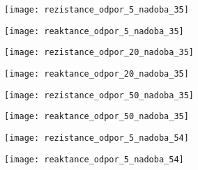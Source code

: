 \begin{figure}
\centering
\begin{minipage}{.5\textwidth}
  \centering
  \texttt{[image: rezistance\_odpor\_5\_nadoba\_35]}
\captionsetup{justification=centering}
\end{minipage}%
\begin{minipage}{.5\textwidth}
  \centering
  \texttt{[image: reaktance\_odpor\_5\_nadoba\_35]}
\captionsetup{justification=centering}
\end{minipage}
\end{figure}

\begin{figure}
\centering
\begin{minipage}{.5\textwidth}
  \centering
  \texttt{[image: rezistance\_odpor\_20\_nadoba\_35]}
\captionsetup{justification=centering}
\end{minipage}%
\begin{minipage}{.5\textwidth}
  \centering
  \texttt{[image: reaktance\_odpor\_20\_nadoba\_35]}
\captionsetup{justification=centering}
\end{minipage}
\end{figure}

\begin{figure}
\centering
\begin{minipage}{.5\textwidth}
  \centering
  \texttt{[image: rezistance\_odpor\_50\_nadoba\_35]}
\captionsetup{justification=centering}
\end{minipage}%
\begin{minipage}{.5\textwidth}
  \centering
  \texttt{[image: reaktance\_odpor\_50\_nadoba\_35]}
\captionsetup{justification=centering}
\end{minipage}
\end{figure}




\begin{figure}
\centering
\begin{minipage}{.5\textwidth}
  \centering
  \texttt{[image: rezistance\_odpor\_5\_nadoba\_54]}
\captionsetup{justification=centering}
\end{minipage}%
\begin{minipage}{.5\textwidth}
  \centering
  \texttt{[image: reaktance\_odpor\_5\_nadoba\_54]}
\captionsetup{justification=centering}
\end{minipage}
\end{figure}

